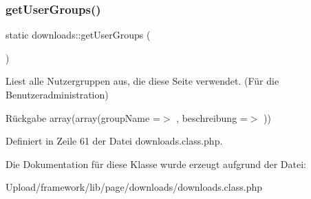 \subsubsection{\texorpdfstring{get\+User\+Groups()}{getUserGroups()}}
{\footnotesize\ttfamily static downloads\+::get\+User\+Groups (\begin{DoxyParamCaption}{ }\end{DoxyParamCaption})\hspace{0.3cm}{\ttfamily [static]}}

Liest alle Nutzergruppen aus, die diese Seite verwendet. (Für die Benutzeradministration) \begin{DoxyReturn}{Rückgabe}
array(array(\textquotesingle{}group\+Name\textquotesingle{} =$>$ \textquotesingle{}\textquotesingle{}, \textquotesingle{}beschreibung\textquotesingle{} =$>$ \textquotesingle{}\textquotesingle{})) 
\end{DoxyReturn}


Definiert in Zeile 61 der Datei downloads.\+class.\+php.



Die Dokumentation für diese Klasse wurde erzeugt aufgrund der Datei\+:\begin{DoxyCompactItemize}
\item 
Upload/framework/lib/page/downloads/downloads.\+class.\+php\end{DoxyCompactItemize}
